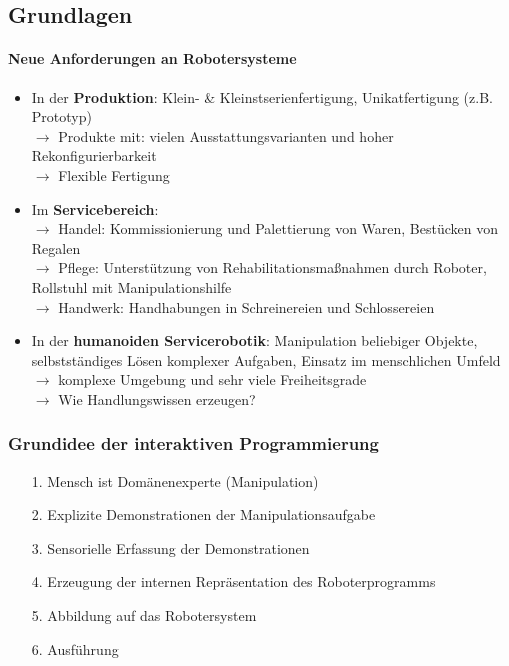 \subsection{Grundlagen}
\paragraph{Neue Anforderungen an Robotersysteme}
\begin{itemize}
\item In der \textbf{Produktion}: Klein- \& Kleinstserienfertigung, Unikatfertigung (z.B. Prototyp)\\
$\rightarrow$ Produkte mit: vielen Ausstattungsvarianten und hoher Rekonfigurierbarkeit\\
$\rightarrow$ Flexible Fertigung
\item Im \textbf{Servicebereich}: \\
$\rightarrow$ Handel:  Kommissionierung und Palettierung von Waren, Bestücken von Regalen\\
$\rightarrow$ Pflege: Unterstützung von Rehabilitationsmaßnahmen durch Roboter, Rollstuhl mit Manipulationshilfe\\
$\rightarrow$ Handwerk: Handhabungen in Schreinereien und Schlossereien
\item In der \textbf{humanoiden Servicerobotik}: Manipulation beliebiger Objekte, selbstständiges Lösen komplexer Aufgaben, Einsatz im menschlichen Umfeld\\
$\rightarrow$ komplexe Umgebung und sehr viele Freiheitsgrade\\
$\rightarrow$ Wie Handlungswissen erzeugen?
\end{itemize}

\subsubsection*{Grundidee der interaktiven Programmierung} %
\begin{itemize}
\item[1.]Mensch ist Domänenexperte (Manipulation)
\item[2.]Explizite Demonstrationen der Manipulationsaufgabe
\item[3.]Sensorielle Erfassung der Demonstrationen
\item[4.]Erzeugung der internen Repräsentation des Roboterprogramms
\item[5.]Abbildung auf das Robotersystem
\item[6.]Ausführung
\end{itemize}

